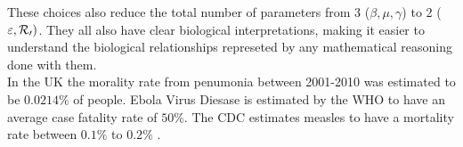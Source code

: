 These choices also reduce the total number of parameters from 3 ($\beta ,\mu ,\gamma$) to 2 ($\varepsilon ,\mathcal{R_0})$.
They all also have clear biological interpretations, making it easier to understand the biological relationships represeted by any mathematical reasoning done with them.\\
In the UK the morality rate from penumonia between 2001-2010 was estimated to be $0.0214\%$ of people\cite{pneu}.
Ebola Virus Diesase is estimated by the WHO to have an average case fatality rate of $50\%$\cite{ebola}.
The CDC estimates measles to have a mortality rate between $0.1\%$ to $0.2\%$ \cite{meas}.
